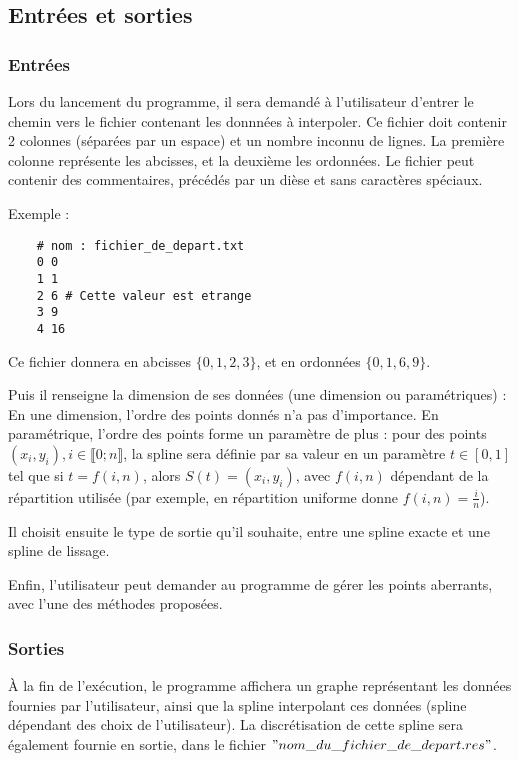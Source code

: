 \documentclass[a4paper,12pt]{article}
\begin{document}
\newpage
\subsection{Entrées et sorties}

\subsubsection{Entrées}

Lors du lancement du programme, il sera demandé à l'utilisateur d'entrer le chemin vers le fichier contenant les donnnées à interpoler.
Ce fichier doit contenir 2 colonnes (séparées par un espace) et un nombre inconnu de lignes. La première colonne représente les abcisses, et la deuxième les ordonnées. Le fichier peut contenir des commentaires, précédés par un dièse et sans caractères spéciaux.

Exemple :

\begin{lstlisting}
    # nom : fichier_de_depart.txt
    0 0
    1 1
    2 6 # Cette valeur est etrange
    3 9
    4 16
\end{lstlisting}

Ce fichier donnera en abcisses  $\{0,1,2,3\}$, et en ordonnées $\{0,1,6,9\}$.

Puis il renseigne la dimension de ses données (une dimension ou paramétriques) : En une dimension, l'ordre des points donnés n'a pas d'importance. En paramétrique, l'ordre des points forme un paramètre de plus : pour des points $(x_i,y_i),i\in \llbracket 0; n \rrbracket$, la spline sera définie par sa valeur en un paramètre $t \in [0,1]$ tel que si $t = f(i,n) $, alors $S(t) = (x_i,y_i)$, avec $f(i,n)$ dépendant de la répartition utilisée (par exemple, en répartition uniforme donne $f(i,n) = \frac{i}{n}$). 

Il choisit ensuite le type de sortie qu'il souhaite, entre une spline exacte et une spline de lissage.

Enfin, l'utilisateur peut demander au programme de gérer les points aberrants, avec l'une des méthodes proposées.

\newpage
\subsubsection{Sorties}

À la fin de l'exécution, le programme affichera un graphe représentant les données fournies par l'utilisateur, ainsi que la spline interpolant ces données (spline dépendant des choix de l'utilisateur). La discrétisation de cette spline sera également fournie en sortie, dans le fichier $"nom\_du\_fichier\_de\_depart.res"$.
\end{document}
